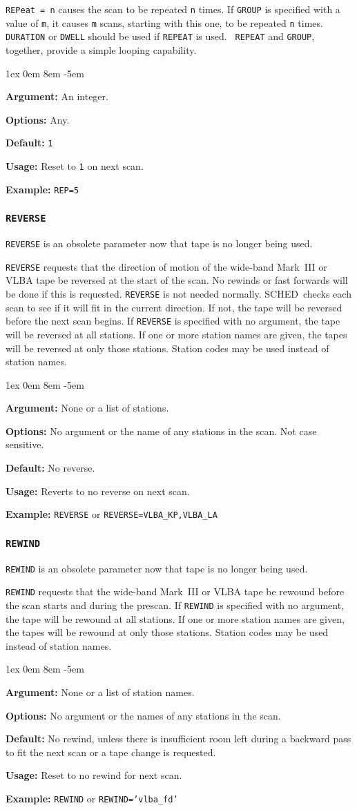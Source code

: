 \documentclass{report}
\newcommand{\schedb}{{\sc SCHED~}}
\newcommand{\rcwbox}[5]{
  \begin{list}{}{\parsep 1ex  \itemsep 0em
                 \leftmargin 8em  \itemindent -5em }
    \item {\bf Argument:} #1
    \item {\bf Options:}  #2
    \item {\bf Default:}  #3
    \item {\bf Usage:}    #4
    \item {\bf Example:}  #5
  \end{list}
}
\begin{document}
{\tt REPeat = n} causes the scan to be repeated {\tt n} times.  If
{\tt GROUP} is specified with a value of {\tt m}, it causes {\tt m}
scans, starting with this one, to be repeated {\tt n} times. {\tt
DURATION} or {\tt DWELL} should be used if {\tt REPEAT} is used. {\tt
REPEAT} and {\tt GROUP}, together, provide a simple looping
capability.

\rcwbox
{An integer.}
{Any.}
{{\tt 1}}
{Reset to {\tt 1} on next scan.}
{{\tt REP=5}}


\subsubsection{\label{MP:REVERSE}{\tt REVERSE}}

{\tt REVERSE} is an obsolete parameter now that tape is no longer
being used.

{\tt REVERSE} requests that the direction of motion of the
wide-band Mark~III or VLBA tape be reversed at the start of the
scan. No rewinds or fast forwards will be done if this is requested.
{\tt REVERSE} is not needed normally. \schedb checks each scan to
see if it will fit in the current direction. If not, the tape will be
reversed before the next scan begins.
If {\tt REVERSE} is specified with no argument, the tape will be
reversed at all stations. If one or more station names are given, the
tapes will be reversed at only those stations.  Station codes may
be used instead of station names.

\rcwbox
{None or a list of stations.}
{No argument or the name of any stations in the scan. Not case
sensitive.}
{No reverse.}
{Reverts to no reverse on next scan.}
{{\tt REVERSE} or {\tt REVERSE=VLBA\_KP,VLBA\_LA}}


\subsubsection{\label{MP:REWIND}{\tt REWIND}}

{\tt REWIND} is an obsolete parameter now that tape is no longer
being used.

{\tt REWIND} requests that the wide-band Mark~III or VLBA
tape be rewound before the scan starts and during the prescan.  If
{\tt REWIND} is specified with no argument, the tape will be rewound
at all stations. If one or more station names are given, the tapes
will be rewound at only those stations.  Station codes may be used
instead of station names.

\rcwbox
{None or a list of station names.}
{No argument or the names of any stations in the scan.}
{No rewind, unless there is insufficient room left during a backward
pass to fit the next scan or a tape change is requested.}
{Reset to no rewind for next scan.}
{{\tt REWIND} or {\tt REWIND='vlba\_fd'}}
\end{document}
